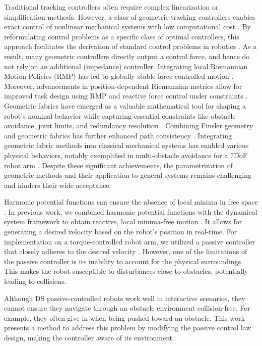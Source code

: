 Traditional tracking controllers often require complex linearization or simplification methods. However, a class of geometric tracking controllers enables exact control of nonlinear mechanical systems with low computational cost \parencite{udwadia2003new}. By reformulating control problems as a specific class of optimal controllers, this approach facilitates the derivation of standard control problems in robotics \parencite{peters2008unifying}. As a result, many geometric controllers directly output a control force, and hence do not rely on an additional (impedance) controller.
Integrating local Riemannian Motion Policies (RMP) has led to globally stable force-controlled motion \parencite{cheng2020rmp}. Moreover, advancements in position-dependent Riemannian metrics allow for improved task design using RMP and reactive force control under constraints \parencite{bylard2021composable}.
Geometric fabrics have emerged as a valuable mathematical tool for shaping a robot's nominal behavior while capturing essential constraints like obstacle avoidance, joint limits, and redundancy resolution \parencite{xie2020geometric}. Combining Finsler geometry and geometric fabrics has further enhanced path consistency \parencite{ratliff2021generalized}.
Integrating geometric fabric methods into classical mechanical systems has enabled various physical behaviors, notably exemplified in multi-obstacle avoidance for a 7DoF robot arm \parencite{van2022geometric}. Despite these significant achievements, the parametrization of geometric methods and their application to general systems remains challenging and hinders their wide acceptance.

Harmonic potential functions can ensure the absence of local minima in free space \parencite{connolly1997harmonic}. In previous work, we combined harmonic potential functions with the dynamical system framework to obtain reactive, local minima-free motion \parencite{huber2019avoidance, huber2023avoidance}. It allows for generating a desired velocity based on the robot's position in real-time.
For implementation on a torque-controlled robot arm, we utilized a passive controller that closely adheres to the desired velocity \parencite{kronander2015passive}. However, one of the limitations of the passive controller is its inability to  account for the physical surroundings. This makes the robot susceptible to disturbances close to obstacles, potentially leading to collisions.

Although DS passive-controlled robots work well in interactive scenarios, they cannot ensure they navigate through an obstacle environment collision-free. For example, they often give in when being pushed toward an obstacle. This work presents a method to address this problem by modifying the passive control law design, making the controller aware of its environment.